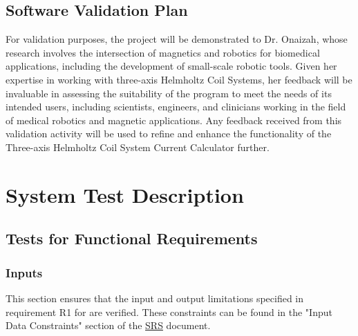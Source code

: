 \documentclass[12pt, titlepage]{article}
\begin{document}
\subsection{Software Validation Plan}\label{sec:SysTestDisc}

For validation purposes, the project will be demonstrated to Dr. Onaizah, whose research involves the intersection of magnetics and robotics for biomedical applications, including the development of small-scale robotic tools. Given her expertise in working with three-axis Helmholtz Coil Systems, her feedback will be invaluable in assessing the suitability of the program to meet the needs of its intended users, including scientists, engineers, and clinicians working in the field of medical robotics and magnetic applications. Any feedback received from this validation activity will be used to refine and enhance the functionality of the Three-axis Helmholtz Coil System Current Calculator further.

\section{System Test Description}
	
\subsection{Tests for Functional Requirements}

\subsubsection{Inputs}\label{subsec:Inputs}
This section ensures that the input and output limitations specified in requirement R1 for \progname{} are verified. These constraints can be found in the "Input Data Constraints" section of the \href{https://github.com/rnorouziani/Helmholtz-Coil-Current-Calculator-CAS741/blob/main/docs/SRS/SRS.pdf}{SRS} document. 
		
\paragraph{ }
\end{document}
